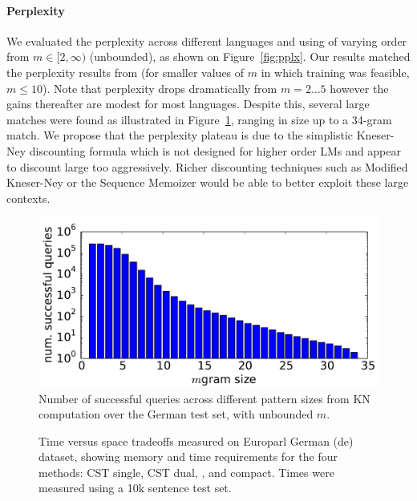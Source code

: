 \paragraph{Perplexity}
We evaluated the perplexity across different languages and using \ngrams of varying order from $m\in[2,\infty)$ (unbounded), as shown on Figure~\ref{fig:pplx}.
Our results matched the perplexity results from \SRILM (for smaller values of $m$ in which \SRILM training was feasible, $m \le 10$).
Note that perplexity drops dramatically from $m=2\ldots5$ however the gains thereafter are modest for most languages.
Despite this, several large \ngram matches were found as illustrated in Figure~\ref{fig:germanpattern}, ranging in size up to a 34-gram match.
We propose that the perplexity plateau is due to the simplistic Kneser-Ney discounting formula which is not designed for higher order \ngram LMs and appear to discount large \ngrams too aggressively. 
Richer discounting techniques such as Modified Kneser-Ney \cite{chen1996empirical} or the Sequence Memoizer \cite{wood2011sequence} would be able to better exploit these large contexts.


\begin{figure}[tb]
\includegraphics[width=\columnwidth]{figures/german_pattern_size.pdf}
\caption{Number of successful queries across different pattern sizes from KN computation over the German test set, with unbounded $m$.}
\label{fig:germanpattern}
\end{figure}

\begin{figure}[tb]

\caption{Time versus space tradeoffs measured on Europarl German (de) dataset, showing memory and time requirements for the four methods: CST single, CST dual, \SRILM, and \SRILM compact. Times were measured using a 10k sentence test set.}
\label{fig:spacetime}
\end{figure}

